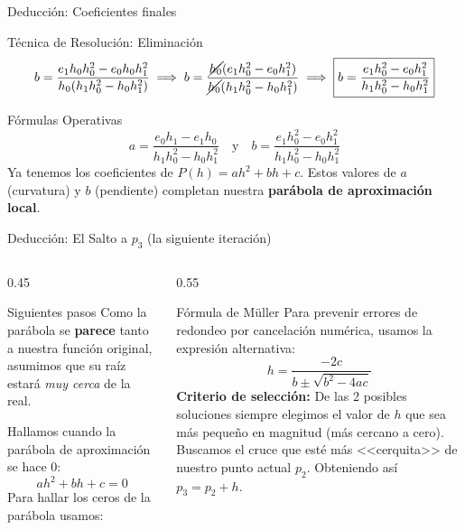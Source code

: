 \documentclass[aspectratio=169, t]{beamer}
\begin{document}
\begin{frame}{Deducción: Coeficientes finales}
    \begin{concept}{Técnica de Resolución: Eliminación}
        \[
        b = \frac{ e_1h_0h_0^2 - e_0h_0h_1^2  }{h_0(h_1h_0^2 - h_0h_1^2)} \implies b = \frac{ \cancel{h_0} (e_1h_0^2 - e_0h_1^2)}{\cancel{h_0}(h_1h_0^2 - h_0h_1^2)} \implies \boxed{b = \frac{e_1h_0^2 - e_0h_1^2}{h_1h_0^2 - h_0h_1^2}}
        \]
    \end{concept}
    \vspace{-0.2cm}
    
    \begin{mathstep}{Fórmulas Operativas}
        \[ a = \frac{e_0 h_1 - e_1 h_0}{h_1 h_0^2 - h_0 h_1^2} \quad \text{y} \quad b = \frac{e_1 h_0^2 - e_0 h_1^2}{h_1 h_0^2 - h_0 h_1^2} \]
        Ya tenemos los coeficientes de $P(h) = ah^2 + bh + c$. Estos valores de $a$ (curvatura) y $b$ (pendiente) completan nuestra \textbf{parábola de aproximación local}.
    \end{mathstep}
\end{frame}

\begin{frame}{Deducción: El Salto a $p_3$ (la siguiente iteración)}
    \vspace{-0.4cm}
    \begin{columns}[T] %
        
        \begin{column}{0.45\textwidth}
            \begin{concept}{Siguientes pasos}
                Como la parábola se \textbf{parece} tanto a nuestra función original, asumimos que su raíz estará \textit{muy cerca} de la real. 
                \vspace{0.5em}
                
                Hallamos cuando la parábola de aproximación se hace $0$:
                \[
                ah^2 + bh + c = 0
                \]
                Para hallar los ceros de la parábola usamos:
            \end{concept}
        \end{column}

        \begin{column}{0.55\textwidth}
            \begin{mathstep}{Fórmula de Müller}
                Para prevenir errores de redondeo por cancelación numérica, usamos la expresión alternativa:
                \[ h = \frac{-2c}{b \pm \sqrt{b^2 - 4ac}} \]
                \small
                \textbf{Criterio de selección:}
                De las 2 posibles soluciones siempre elegimos el valor de $h$ que sea más pequeño en magnitud (más cercano a cero). Buscamos el cruce que esté más <<cerquita>> de nuestro punto actual $p_2$. Obteniendo así $p_3 = p_2 + h$.
            \end{mathstep}
        \end{column}
        
    \end{columns}
\end{frame}
\end{document}

